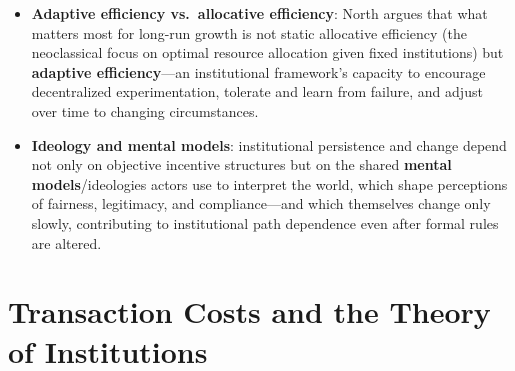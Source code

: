 \documentclass[12pt]{article}
\begin{document}
\begin{itemize}[leftmargin=*, itemsep=4pt]
    \item \textbf{Adaptive efficiency vs.\ allocative efficiency}: North argues that what matters most for long-run growth is not static allocative efficiency (the neoclassical focus on optimal resource allocation given fixed institutions) but \textbf{adaptive efficiency}---an institutional framework's capacity to encourage decentralized experimentation, tolerate and learn from failure, and adjust over time to changing circumstances.
    \item \textbf{Ideology and mental models}: institutional persistence and change depend not only on objective incentive structures but on the shared \textbf{mental models}/ideologies actors use to interpret the world, which shape perceptions of fairness, legitimacy, and compliance---and which themselves change only slowly, contributing to institutional path dependence even after formal rules are altered.
\end{itemize}

\section{Transaction Costs and the Theory of Institutions}
\end{document}
